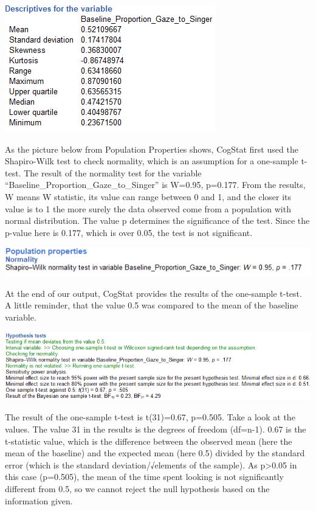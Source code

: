 \documentclass[
]{book}
\begin{document}
\includegraphics{img/ch6/6.4descr.png}

As the picture below from Population Properties shows, CogStat first used the Shapiro-Wilk test to check normality, which is an assumption for a one-sample t-test. The result of the normality test for the variable ``Baseline\_Proportion\_Gaze\_to\_Singer'' is W=0.95, p=0.177. From the results, W means W statistic, its value can range between 0 and 1, and the closer its value is to 1 the more surely the data observed come from a population with normal distribution. The value p determines the significance of the test. Since the p-value here is 0.177, which is over 0.05, the test is not significant.

\includegraphics{img/ch6/6.4poppropSW.png}

At the end of our output, CogStat provides the results of the one-sample t-test. A little reminder, that the value 0.5 was compared to the mean of the baseline variable.

\includegraphics{img/ch6/6.4hyptest.png}

The result of the one-sample t-test is t(31)=0.67, p=0.505. Take a look at the values. The value 31 in the results is the degrees of freedom (df=n-1). 0.67 is the t-statistic value, which is the difference between the observed mean (here the mean of the baseline) and the expected mean (here 0.5) divided by the standard error (which is the standard deviation/√elements of the sample). As p\textgreater0.05 in this case (p=0.505), the mean of the time spent looking is not significantly different from 0.5, so we cannot reject the null hypothesis based on the information given.
\end{document}
